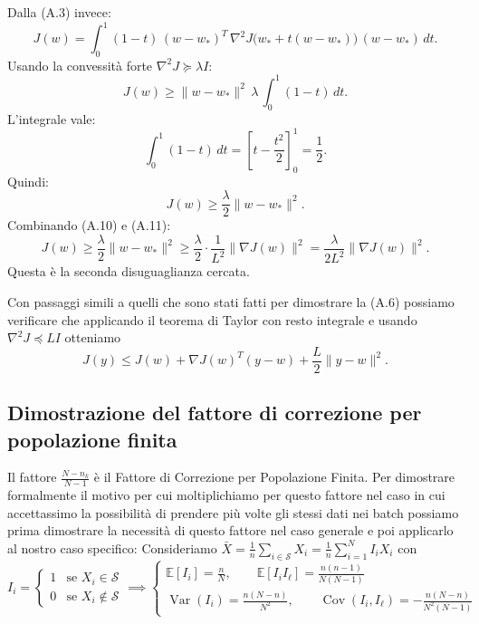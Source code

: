 \documentclass[a4paper,12pt]{article}
\begin{document}
Dalla (A.3) invece:
\[
J(w) = \int_0^1 (1-t) \, (w - w_*)^T \, \nabla^2 J\bigl(w_* + t(w - w_*)\bigr) \, (w - w_*) \, dt.
\]
Usando la convessità forte $\nabla^2 J \succeq \lambda I$:
\[
J(w) \ge \|w - w_*\|^2 \, \lambda \, \int_0^1 (1-t) \, dt.
\]
L'integrale vale:
\[
\int_0^1 (1-t) \, dt = \left[t - \frac{t^2}{2}\right]_0^1 = \frac{1}{2}.
\]
Quindi:
\[
J(w) \geq \frac{\lambda}{2} \|w - w_*\|^2. \tag{A.11}
\]
Combinando (A.10) e (A.11):
\[
J(w) \geq \frac{\lambda}{2} \|w - w_*\|^2 \geq \frac{\lambda}{2} \cdot \frac{1}{L^2} \|\nabla J(w)\|^2 = \frac{\lambda}{2L^2} \|\nabla J(w)\|^2.
\]
Questa è la seconda disuguaglianza cercata.

Con passaggi simili a quelli che sono stati fatti per dimostrare la (A.6) possiamo verificare che applicando il teorema di Taylor con resto integrale e usando \(\nabla^2 J \preceq LI\) otteniamo
\[
J(y) \le J(w) + \nabla J(w)^T(y - w) + \frac{L}{2}\|y - w\|^2. \tag{A.12}
\]

\newpage
\subsection{Dimostrazione del fattore di correzione per \newline popolazione finita}


Il fattore $\frac{N-n_k}{N-1}$ \`e il Fattore di Correzione per Popolazione Finita. Per dimostrare formalmente il motivo per cui moltiplichiamo per questo fattore nel caso in cui accettassimo la possibilità di prendere più volte gli stessi dati nei batch possiamo prima dimostrare la necessità di questo fattore nel caso generale e poi applicarlo al nostro caso specifico:
Consideriamo $
\bar{X} = \frac{1}{n}\sum_{i \in \mathcal{S}} X_i = \frac{1}{n}\sum_{i=1}^N I_i X_i
$
con
\[
I_i = 
\begin{cases} 
1 & \text{se } X_i \in \mathcal{S} \\ 
0 & \text{se } X_i \notin \mathcal{S}
\end{cases}
 \implies
\begin{cases}
\mathbb{E}[I_i] = \frac{n}{N}, \qquad \mathbb{E}[I_i I_\ell] = \frac{n(n-1)}{N(N-1)}
\\
\operatorname{Var}(I_i) = \frac{n(N-n)}{N^2}, \qquad 
\operatorname{Cov}(I_i, I_\ell) = -\frac{n(N-n)}{N^2(N-1)}
\end{cases}\]
\end{document}
